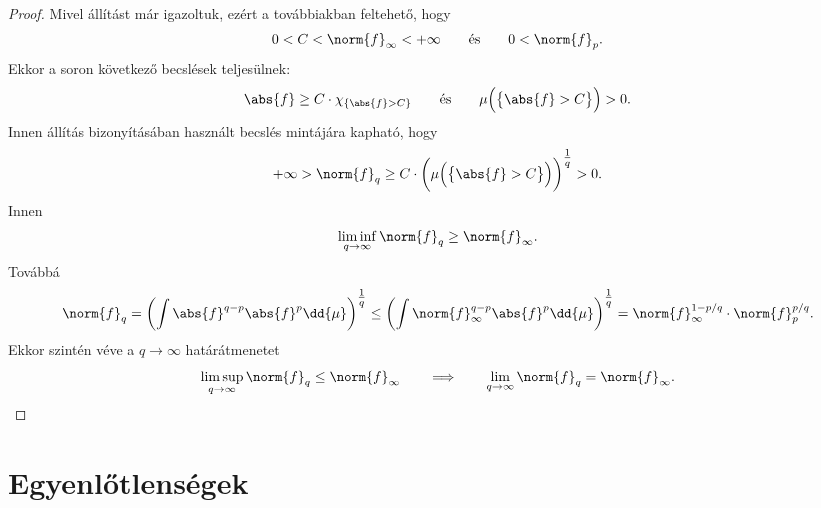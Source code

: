 \documentclass[
]{elteikthesis}[2024/04/26]
\begin{document}
\begin{proof}
		Mivel  állítást már igazoltuk,
		ezért a továbbiakban feltehető, hogy
		\[
			0 < C < \norm{f}_\infty < +\infty
			\qquad \text{és} \qquad
			0 < \norm{f}_p.
		\]
		Ekkor a soron következő becslések teljesülnek:
		\[
			\abs{f} \geq C \cdot \chi_{\{ \abs{f} > C \}}
			\qquad \text{és} \qquad
			\mu \Bigl( \bigl\{ \abs{f} > C \bigr\} \Bigr) > 0.
		\]
		Innen  állítás bizonyításában használt 
		becslés mintájára kapható, hogy
		\[
			+\infty > 
			\norm{f}_q \geq 
			C \cdot \biggl( \mu \Bigl( \bigl\{ \abs{f} > C \bigr\} \Bigr) \biggr)^{\tfrac{1}{q}}
			> 0.
		\]
		Innen
		\[
			\liminf_{q \to \infty} \norm{f}_q \geq \norm{f}_\infty.
		\]
		Továbbá
		\[
			\norm{f}_q = 
			\biggl( \int \abs{f}^{q-p} \abs{f}^p \dd{\mu} \biggr)^{\tfrac{1}{q}} \leq
			\biggl( \int \norm{f}_\infty^{q-p} \abs{f}^p \dd{\mu} \biggr)^{\tfrac{1}{q}} =
			\norm{f}_{\infty}^{1 - p/q} \cdot \norm{f}_p^{p/q}.
		\]
		Ekkor szintén véve a \( q \to \infty \) határátmenetet
		\[
			\limsup_{q \to \infty} \norm{f}_q \leq \norm{f}_\infty
			\qquad \Longrightarrow \qquad
			\lim_{q \to \infty} \norm{f}_q = \norm{f}_\infty.
		\]
	\end{proof}
	
	\newpage
	
	\section{Egyenlőtlenségek}
	
\end{document}
